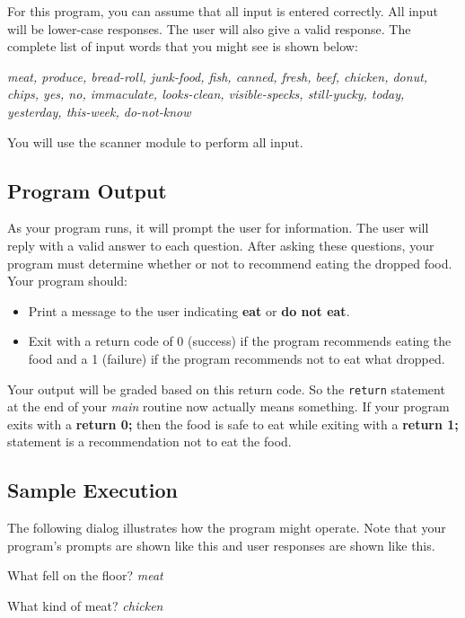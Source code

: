 \documentclass[12pt]{article}
\begin{document}
For this program, you can assume that all input is entered correctly.
All input will be lower-case responses.  The user will also give a valid response.
The complete list of input words that you might see is shown below:

{\it meat, produce, bread-roll, junk-food, fish, canned, fresh, beef, chicken,
donut, chips, yes, no, immaculate, looks-clean, visible-specks, still-yucky, today,
yesterday, this-week, do-not-know}

You will use the scanner module to perform all input.

\subsection*{Program Output}

As your program runs, it will prompt the user for information.  The user will
reply with a valid answer to each question.  After asking these questions, your
program must determine whether or not to recommend eating the dropped food.  Your
program should:

\begin{itemize}
\item Print a message to the user indicating {\bf eat} or {\bf do not eat}.
\item Exit with a return code of 0 (success) if the program recommends eating
the food and a 1 (failure) if the program recommends not to eat what dropped.
\end{itemize}

Your output will be graded based on this return code.  So the {\tt return}
statement at the end of your {\it main} routine now actually means something.
If your program exits with a {\bf return 0;} then the food is safe to eat while
exiting with a {\bf return 1;} statement is a recommendation not to eat the food.

\subsection*{Sample Execution}

The following dialog illustrates how the program might operate.  Note that 
your program's prompts are shown {\color{blue} like this} and
user responses are shown {\color{red} like this}.

{\color{blue} What fell on the floor?} {\color{red} {\it meat}}

{\color{blue} What kind of meat?} {\color{red} {\it chicken}}
\end{document}
